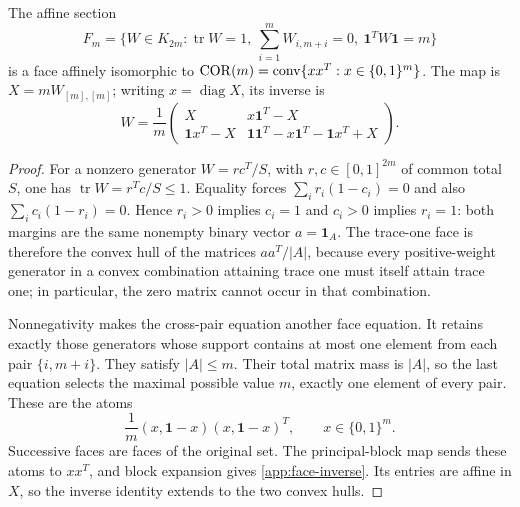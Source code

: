 \begin{theorem}\label{app:correlation-face}
The affine section
\[
 F_m=\{W\in K_{2m}:\operatorname{tr}W=1,
 \ \sum_{i=1}^mW_{i,m+i}=0,\ \mathbf1^TW\mathbf1=m\}
\]
is a face affinely isomorphic to
$\operatorname{COR}(m)=\operatorname{conv}\{xx^T:x\in\{0,1\}^m\}$.
The map is $X=mW_{[m],[m]}$; writing $x=\operatorname{diag}X$, its
inverse is
\begin{equation}
 W=\frac1m
 \begin{pmatrix}
 X&x\mathbf1^T-X\\
 \mathbf1x^T-X&\mathbf1\mathbf1^T-x\mathbf1^T-\mathbf1x^T+X
 \end{pmatrix}.
 \label{app:face-inverse}
\end{equation}
\end{theorem}
\begin{proof}
For a nonzero generator $W=rc^T/S$, with $r,c\in[0,1]^{2m}$ of
common total $S$, one has $\operatorname{tr}W=r^Tc/S\le1$.
Equality forces $\sum_i r_i(1-c_i)=0$ and also
$\sum_i c_i(1-r_i)=0$. Hence $r_i>0$ implies $c_i=1$ and
$c_i>0$ implies $r_i=1$: both margins are the same nonempty binary
vector $a=\mathbf1_A$. The trace-one face is therefore the convex
hull of the matrices $aa^T/|A|$, because every positive-weight generator in a
convex combination attaining trace one must itself attain trace one;
in particular, the zero matrix cannot occur in that combination.

Nonnegativity makes the cross-pair equation another face equation.
It retains exactly those generators whose support contains at most
one element from each pair $\{i,m+i\}$. They satisfy $|A|\le m$.
Their total matrix mass is $|A|$, so the last equation selects the
maximal possible value $m$, exactly one element of every pair.
These are the atoms
\[
 \frac1m(x,\mathbf1-x)(x,\mathbf1-x)^T,
 \qquad x\in\{0,1\}^m.
\]
Successive faces are faces of the original set. The principal-block
map sends these atoms to $xx^T$, and block expansion gives
\eqref{app:face-inverse}. Its entries are affine in $X$, so the inverse
identity extends to the two convex hulls.
\end{proof}


